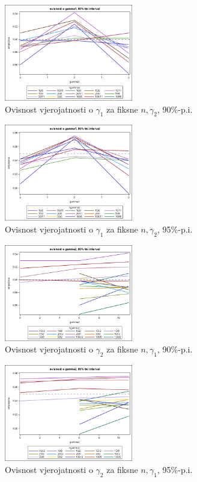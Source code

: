 \documentclass[11pt]{scrartcl}
\begin{document}
\begin{figure}[h]
	\centering
	\includegraphics[width=0.5\textwidth]{assets/graf190.png}
	\caption{Ovisnost vjerojatnosti o \( \gamma_1 \) za fiksne \( n, \gamma_2 \), 90\%-p.i.}
	\label{graf190}
\end{figure}

\begin{figure}[h]
	\centering
	\includegraphics[width=0.5\textwidth]{assets/graf195.png}
	\caption{Ovisnost vjerojatnosti o \( \gamma_1 \) za fiksne \( n, \gamma_2 \), 95\%-p.i.}
	\label{graf195}
\end{figure}

\begin{figure}[h]
	\centering
	\includegraphics[width=0.5\textwidth]{assets/graf290.png}
	\caption{Ovisnost vjerojatnosti o \( \gamma_2 \) za fiksne \( n, \gamma_1 \), 90\%-p.i.}
	\label{graf290}
\end{figure}

\begin{figure}[h]
	\centering
	\includegraphics[width=0.5\textwidth]{assets/graf295.png}
	\caption{Ovisnost vjerojatnosti o \( \gamma_2 \) za fiksne \( n, \gamma_1 \), 95\%-p.i.}
	\label{graf295}
\end{figure}

\clearpage

\end{document}
